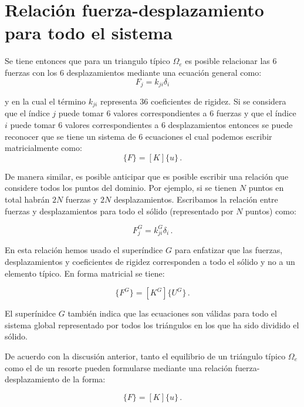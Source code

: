 \section{Relación fuerza-desplazamiento para todo el sistema}
Se tiene entonces que para un triangulo típico $\Omega_e$ es posible relacionar 
las 6 fuerzas con los 6 desplazamientos mediante una ecuación general como:
\begin{equation}
F_j = k_ {ji} \delta_i
\end{equation}

y en la cual el término $k_{ji}$ representa 36 coeficientes de rigidez. Si se 
considera que el índice $j$ puede tomar 6 valores correspondientes a 6 fuerzas 
y que el índice $i$ puede tomar 6 valores correspondientes a 6 desplazamientos 
entonces se puede reconocer que se tiene un sistema de 6 ecuaciones el cual 
podemos escribir matricialmente como:
\begin{equation}
\{ F \}=[ K ] \{ u \}\, .
\end{equation}

De manera similar, es posible anticipar que es posible escribir una relación 
que considere todos los puntos del dominio. Por ejemplo, si se tienen $N$ 
puntos en total habrán $2N$ fuerzas y $2N$ desplazamientos. Escribamos la 
relación entre fuerzas y desplazamientos para todo el sólido (representado por 
$N$ puntos) como:

\begin{equation}
F_j^G = k_ {ji}^G \delta_i\, .
\end{equation}

En esta relación hemos usado el superíndice $G$ para enfatizar que las fuerzas, 
desplazamientos y coeficientes de rigidez corresponden a todo el sólido y no a 
un elemento típico. En forma matricial se tiene:

\begin{equation}
\{ F^G \} = [ K^G ] \{ U^G \}\, .
\end{equation}

El superínidce $G$ también indica que las ecuaciones son válidas para todo el 
sistema global representado por todos los triángulos en los que ha sido 
dividido el sólido.

De acuerdo con la discusión anterior, tanto el equilibrio de un triángulo 
típico $\Omega_e$ como el de un resorte pueden formularse mediante una relación 
fuerza-desplazamiento de la forma:

\begin{equation}
\{ F \} = [ K ] \{ u \}\, .
\end{equation}

